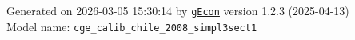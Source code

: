 \documentclass[10pt,a4paper]{article}
\numberwithin{equation}{section}
\begin{document}
\begin{landscape}
\begin{flushleft}{\large
Generated  on 2026-03-05 15:30:14 by \href{http://gecon.r-forge.r-project.org/}{\texttt{gEcon}} version 1.2.3 (2025-04-13)\\
Model name: \verb+cge_calib_chile_2008_simpl3sect1+
}\end{flushleft}


\end{landscape}

\end{document}
